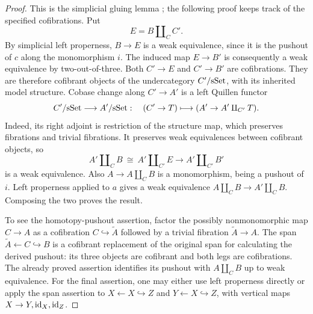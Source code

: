 \begin{proof}
This is the simplicial gluing lemma
\cite[II.8.8 and II.8.12]{GoerssJardine1999}; the following proof
keeps track of the specified cofibrations.  Put
\[
 E=B\amalg_C C'.
\]
By simplicial left properness, $B\to E$ is a weak equivalence,
since it is the pushout of $c$ along the monomorphism $i$.  The
induced map $E\to B'$ is consequently a weak equivalence by
two-out-of-three.  Both $C'\to E$ and $C'\to B'$ are cofibrations.
They are therefore cofibrant objects of the undercategory
$C'/\mathrm{sSet}$, with its inherited model structure.  Cobase change along
$C'\to A'$ is a left Quillen functor
\[
 C'/\mathrm{sSet}\longrightarrow A'/\mathrm{sSet}:
 \quad (C'\to T)\longmapsto(A'\to A'\amalg_{C'}T).
\]
Indeed, its right adjoint is restriction of the structure map,
which preserves fibrations and trivial fibrations.  It preserves
weak equivalences between cofibrant objects, so
\[
 A'\amalg_C B\ \cong\ A'\amalg_{C'}E
       \longrightarrow A'\amalg_{C'}B'
\]
is a weak equivalence.  Also $A\to A\amalg_CB$ is a monomorphism,
being a pushout of $i$.  Left properness applied to $a$ gives a
weak equivalence
$A\amalg_CB\to A'\amalg_CB$.  Composing the two proves the result.

To see the homotopy-pushout assertion, factor the possibly
nonmonomorphic map $C\to A$ as a cofibration $C\hookrightarrow
\widetilde A$ followed by a trivial fibration
$\widetilde A\to A$.  The span
$\widetilde A\leftarrow C\hookrightarrow B$ is a cofibrant
replacement of the original span for calculating the derived
pushout: its three objects are cofibrant and both legs are
cofibrations.  The already proved assertion identifies its pushout
with $A\amalg_CB$ up to weak equivalence.
For the final assertion, one may either use left properness directly
or apply the span assertion to
$X\leftarrow X\hookrightarrow Z$ and
$Y\leftarrow X\hookrightarrow Z$, with vertical maps
$X\to Y,\mathrm{id}_X,\mathrm{id}_Z$.
\end{proof}
